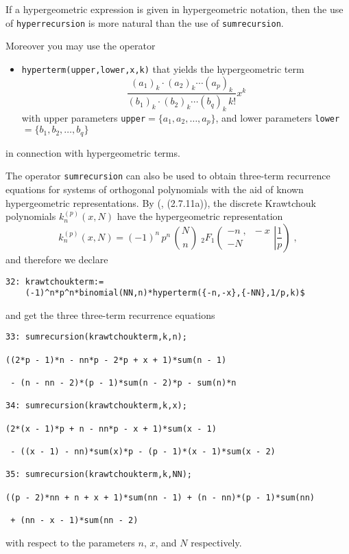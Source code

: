 If a hypergeometric expression is given in hypergeometric notation, then
the use of {\tt hyperrecursion} is more natural than the use of
{\tt sumrecursion}.

Moreover you may use the \REDUCE{} operator
\begin{itemize}
\item
{\tt hyperterm(upper,lower,x,k)} that yields the hypergeometric term
\[
\frac
{(a_{1})_{k}\cdot(a_{2})_{k}\cdots(a_{p})_{k}}
{(b_{1})_{k}\cdot(b_{2})_{k}\cdots(b_{q})_{k}\,k!}x^{k}
\]
with upper parameters {\tt upper}$=\{a_{1}, a_{2}, \ldots, a_{p}\}$,
and lower parameters {\tt lower}$=\{b_{1}, b_{2}, \ldots, b_{q}\}$
\end{itemize}
in connection with hypergeometric terms.

The operator {\tt sumrecursion} can also be used to
obtain three-term recurrence equations for systems of orthogonal polynomials
with the aid of known hypergeometric representations. By
(\cite{NikiforovUvarovSuslov:91}, (2.7.11a)), the discrete Krawtchouk polynomials $k_n^{(p)}(x,N)$
have the hypergeometric representation
\[
k_n^{(p)}(x,N)=
(-1)^n\,p^n\,\binom{N}{n}\;
_2 F_1\left.
\left(
\begin{array}{c}
-n\;,\;\;-x\\[1mm]
-N
\end{array}
\right| \frac{1}{p}\right)
\;,
\]
and therefore we declare

{\small
\begin{verbatim}
32: krawtchoukterm:=
    (-1)^n*p^n*binomial(NN,n)*hyperterm({-n,-x},{-NN},1/p,k)$
\end{verbatim}
}\noindent
and get the three three-term recurrence equations

{\small
\begin{verbatim}
33: sumrecursion(krawtchoukterm,k,n);

((2*p - 1)*n - nn*p - 2*p + x + 1)*sum(n - 1)

 - (n - nn - 2)*(p - 1)*sum(n - 2)*p - sum(n)*n

34: sumrecursion(krawtchoukterm,k,x);

(2*(x - 1)*p + n - nn*p - x + 1)*sum(x - 1)

 - ((x - 1) - nn)*sum(x)*p - (p - 1)*(x - 1)*sum(x - 2)

35: sumrecursion(krawtchoukterm,k,NN);

((p - 2)*nn + n + x + 1)*sum(nn - 1) + (n - nn)*(p - 1)*sum(nn)

 + (nn - x - 1)*sum(nn - 2)
\end{verbatim}
}\noindent
with respect to the parameters $n$, $x$, and $N$ respectively.

